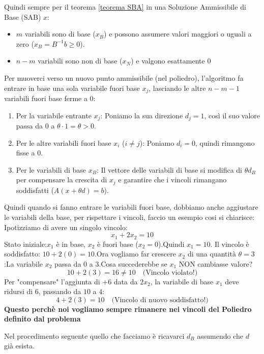 Quindi sempre per il teorema \ref{teorema SBA} in una Soluzione Ammissibile di Base (SAB) $x$:
\begin{itemize}
    \item $m$ variabili sono di base ($x_B$) e possono assumere valori maggiori o uguali a zero ($x_B = B^{-1}b \ge 0$).
    \item $n - m$ variabili sono non di base ($x_N$) e valgono esattamente $0$
\end{itemize}

Per muoverci verso un nuovo punto ammissibile (nel poliedro), l'algoritmo fa entrare in base una sola variabile fuori base $x_j$, lasciando le altre $n - m - 1$ variabili fuori base ferme a $0$: 

\begin{enumerate}
    \item Per la variabile entrante $x_j$: Poniamo la sua direzione $d_j = 1$, così il suo valore passa da $0$ a $\theta \cdot 1 = \theta > 0$.
    \item Per le altre variabili fuori base $x_i$ ($i \neq j$): Poniamo $d_i = 0$, quindi rimangono fisse a $0$.  
    \item Per le variabili di base $x_B$: Il vettore delle variabili di base si modifica di $\theta d_B$ per compensare la crescita di $x_j$ e garantire che i vincoli rimangano soddisfatti ($A(x + \theta d) = b$).
\end{enumerate}
Quindi quando si fanno entrare le variabili fuori base, dobbiamo anche aggiustare le variabili della base, per rispettare i vincoli, faccio un esempio cosi si chiarisce:\\
Ipotizziamo di avere un singolo vincolo:$$x_1 + 2 x_2 = 10$$Stato iniziale:$x_1$ è in base, $x_2$ è fuori base ($x_2 = 0$).Quindi $x_1 = 10$. Il vincolo è soddisfatto: $10 + 2(0) = 10$.Ora vogliamo far crescere $x_2$ di una quantità $\theta = 3$:La variabile $x_2$ passa da $0$ a $3$.Cosa succederebbe se $x_1$ NON cambiasse valore?$$10 + 2(3) = 16 \neq 10 \quad \text{(Vincolo violato!)}$$Per "compensare" l'aggiunta di $+6$ data da $2 x_2$, la variabile di base $x_1$ deve ridursi di $6$, passando da $10$ a $4$:$$4 + 2(3) = 10 \quad \text{(Vincolo di nuovo soddisfatto!)}$$
\textbf{Questo perchè noi vogliamo sempre rimanere nei vincoli del Poliedro definito dal problema}
\begin{center}
    Nel procedimento seguente quello che facciamo è ricavarci $d_B$ assumendo che $d$ già esista.
\end{center}

